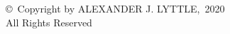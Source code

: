 
\thispagestyle{empty}
\addtocounter{page}{-1}
\vspace*{\fill}
\vfill
\begin{center}
\copyright\ Copyright by \MakeUppercase{Alexander J. Lyttle},~2020\\
All Rights Reserved
\end{center}
\clearpage